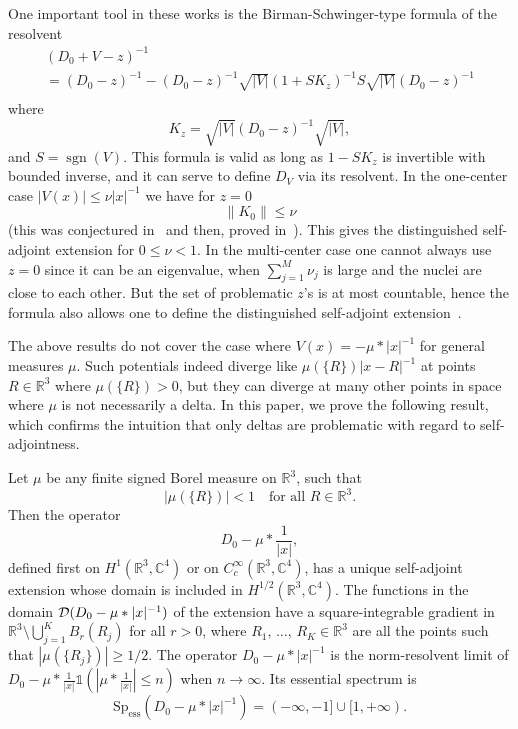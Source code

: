\documentclass[AHL,Unicode,published]{cedram}
\newcommand{\R}{\mathbb{R}}
\newcommand{\C}{\mathbb{C}}
\newcommand{\cD}{\mathcal{D}}
\newcommand{\Spec}{\mathrm{Sp}}
\DeclareMathOperator{\sgn}{sgn}
\DeclareMathOperator{\ess}{ess}
\newcommand\1{{\ensuremath {\mathds 1} }}
\newcommand{\ii}{\infty}
\newcommand{\norm}[1]{ \left\| #1 \right\|}
\renewcommand{\geq}{\geqslant}
\renewcommand{\leq}{\leqslant}
\begin{document}
One important tool in these works is the Birman-Schwinger-type formula of the resolvent~\cite{Klaus-80b,KlaWus-79,Nenciu-76}
\begin{multline}\label{eq:resolvent}
\left(D_0+V-z\right)^{-1}\\
=\left(D_0-z\right)^{-1}-\left(D_0-z\right)^{-1}\sqrt{|V|}\left(1+SK_z\right)^{-1}S\sqrt{|V|}\left(D_0-z\right)^{-1}\\
\end{multline}
where
\begin{equation}\label{eq:def_K}
K_z=\sqrt{|V|}(D_0-z)^{-1}\sqrt{|V|},
\end{equation}
and $S=\sgn(V)$. This formula is valid as long as $1-SK_z$ is invertible with bounded inverse, and it can serve to define $D_V$ via its resolvent. In the one-center case $|V(x)|\leq \nu|x|^{-1}$ we have for $z=0$
\[
\norm{K_0}\leq \nu
\]
(this was conjectured in~\cite{Nenciu-76} and then, proved in~\cite{ArrDuoVeg-13,Kato-83,Wust-77}). This gives the distinguished self-adjoint extension for $0\leq\nu<1$. In the multi-center case one cannot always use $z=0$ since it can be an eigenvalue, when $\sum_{j=1}^M\nu_j$ is large and the nuclei are close to each other. But the set of problematic $z$'s is at most countable, hence the formula also allows one to define the distinguished self-adjoint extension~\cite{Klaus-80b,Nenciu-77}.

The above results do not cover the case where $V(x)=-\mu\ast|x|^{-1}$ for general measures $\mu$. Such potentials indeed diverge like $\mu(\{R\})|x-R|^{-1}$ at points $R\in\R^3$ where $\mu(\{R\})>0$, but they can diverge at many other points in space where $\mu$ is not necessarily a delta. In this paper, we prove the following result, which confirms the intuition that only deltas are problematic with regard to self-adjointness.

\begin{theo}\label{thm:distinguished}
Let $\mu$ be any finite signed Borel measure on $\R^3$, such that
\[
\left|\mu(\{R\})\right|<1\quad \text{for all }R\in\R^3.
\]
Then the operator
\[
D_0-\mu\ast\frac{1}{|x|},
\]
defined first on $H^1(\R^3,\C^4)$ or on $C^\ii_c(\R^3,\C^4)$, has a unique self-adjoint extension whose domain is included in $H^{1/2}(\R^3,\C^4)$. The functions in the domain $\cD(D_0-\linebreak\mu\ast|x|^{-1})$ of the extension have a square-integrable gradient in $\R^3\setminus\bigcup_{j=1}^KB_r(R_j)$ for all $r>0$, where $R_1,\,\dots,\,R_K\in\R^3$ are all the points such that $|\mu(\{R_j\})|\geq1/2$. The operator $D_0-\mu\ast|x|^{-1}$ is the norm-resolvent limit of $D_0-\mu\ast\frac{1}{|x|}\1(|\mu\ast\frac{1}{|x|}|\leq n)$ when $n\to\ii$. Its essential spectrum is
\[
\Spec_{\ess}\left(D_0-\mu\ast|x|^{-1}\right)=(-\ii,-1]\cup[1,+\ii).
\]
\end{theo}
\end{document}

